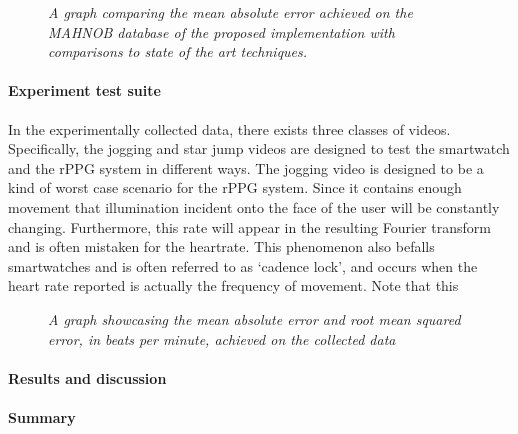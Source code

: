 \begin{figure}
    \centering
    \scalebox{0.6}{}
   \caption{\textit{A graph comparing the mean absolute error achieved on the MAHNOB database of the proposed implementation with comparisons to state of the art techniques.}}
\end{figure}
\paragraph{Experiment test suite}
In the experimentally collected data, there exists three classes of videos. Specifically, the jogging and star jump videos are designed to test the smartwatch and 
the rPPG system in different ways. The jogging video is designed to be a kind of worst case scenario for the rPPG system. Since it contains enough movement that
illumination incident onto the face of the user will be constantly changing. Furthermore, this rate will appear in the resulting Fourier transform and is often mistaken
for the heartrate. This phenomenon also befalls smartwatches and is often referred to as `cadence lock', and occurs when the heart rate reported is actually the frequency 
of movement.
Note that this 

\begin{figure}
    \centering
    \scalebox{0.6}{}
   \caption{\textit{A graph showcasing the mean absolute error and root mean squared error, in beats per minute, achieved on the collected data}}
\end{figure}

\paragraph{Results and discussion}

\paragraph{Summary}


